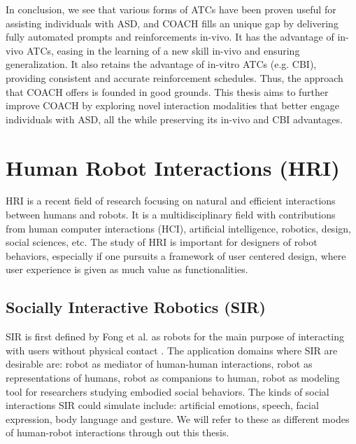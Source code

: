 \documentclass{ut-thesis}
\begin{document}
In conclusion, we see that various forms of ATCs have been proven useful for assisting individuals with ASD, and COACH fills an unique gap by delivering fully automated prompts and reinforcements in-vivo.  It has the advantage of in-vivo ATCs, easing in the learning of a new skill in-vivo and ensuring generalization.  It also retains the advantage of in-vitro ATCs (e.g. CBI), providing consistent and accurate reinforcement schedules.  Thus, the approach that COACH offers is founded in good grounds.  This thesis aims to further improve COACH by exploring novel interaction modalities that better engage individuals with ASD, all the while preserving its in-vivo and CBI advantages.
\section{Human Robot Interactions (HRI)}

HRI is a recent field of research focusing on natural and efficient interactions between humans and robots.  It is a multidisciplinary field with contributions from human computer interactions (HCI), artificial intelligence, robotics, design, social sciences, etc.  The study of HRI is important for designers of robot behaviors, especially if one pursuits a framework of user centered design, where user experience is given as much value as functionalities. 


\subsection{Socially Interactive Robotics (SIR)}
SIR is first defined by Fong et al. as robots for the main purpose of interacting with users without physical contact \cite{fong2003survey}.  The application domains where SIR are desirable are: robot as mediator of human-human interactions, robot as representations of humans, robot as companions to human, robot as modeling tool for researchers studying embodied social behaviors.  The kinds of social interactions SIR could simulate include: artificial emotions, speech, facial expression, body language and gesture.  We will refer to these as different modes of human-robot interactions through out this thesis.
\end{document}
